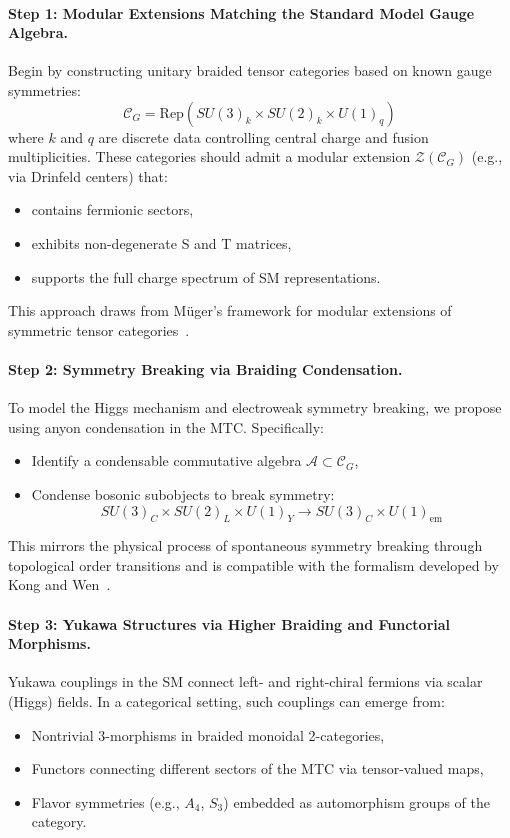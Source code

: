 \documentclass[11pt]{article}
\begin{document}
\paragraph{Step 1: Modular Extensions Matching the Standard Model Gauge Algebra.}

Begin by constructing unitary braided tensor categories based on known gauge symmetries:
\[
\mathcal{C}_G = \text{Rep}(SU(3)_k \times SU(2)_k \times U(1)_q)
\]
where \(k\) and \(q\) are discrete data controlling central charge and fusion multiplicities. These categories should admit a modular extension \(\mathcal{Z}(\mathcal{C}_G)\) (e.g., via Drinfeld centers) that:
\begin{itemize}
    \item contains fermionic sectors,
    \item exhibits non-degenerate S and T matrices,
    \item supports the full charge spectrum of SM representations.
\end{itemize}

This approach draws from Müger’s framework for modular extensions of symmetric tensor categories~\cite{muger2003}.

\paragraph{Step 2: Symmetry Breaking via Braiding Condensation.}

To model the Higgs mechanism and electroweak symmetry breaking, we propose using anyon condensation in the MTC. Specifically:
\begin{itemize}
    \item Identify a condensable commutative algebra \(\mathcal{A} \subset \mathcal{C}_G\),
    \item Condense bosonic subobjects to break symmetry:
    \[
    SU(3)_C \times SU(2)_L \times U(1)_Y \longrightarrow SU(3)_C \times U(1)_{\text{em}}
    \]
\end{itemize}
This mirrors the physical process of spontaneous symmetry breaking through topological order transitions and is compatible with the formalism developed by Kong and Wen~\cite{kong2014anyon}.

\paragraph{Step 3: Yukawa Structures via Higher Braiding and Functorial Morphisms.}

Yukawa couplings in the SM connect left- and right-chiral fermions via scalar (Higgs) fields. In a categorical setting, such couplings can emerge from:
\begin{itemize}
    \item Nontrivial 3-morphisms in braided monoidal 2-categories,
    \item Functors connecting different sectors of the MTC via tensor-valued maps,
    \item Flavor symmetries (e.g., \(A_4\), \(S_3\)) embedded as automorphism groups of the category.
\end{itemize}
\end{document}
